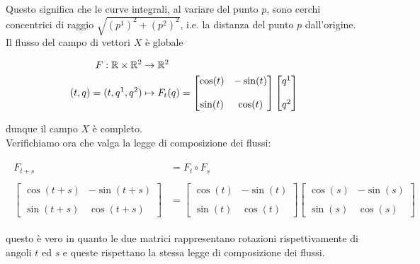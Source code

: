 Questo significa che le curve integrali, al variare del punto $ p $, sono cerchi concentrici di raggio $ \sqrt{(p^{1})^{2} + (p^{2})^{2}} $, i.e. la distanza del punto $ p $ dall'origine.\\
Il flusso del campo di vettori $ X $ è globale

\begin{align}
	\begin{split}
		F : \R \times \R^{2} &\to \R^{2}\\
		(t,q) = (t,q^{1},q^{2}) &\mapsto F_{t}(q) = %
		\begin{bmatrix}
			\cos(t) & - \sin(t) \\\\%
			\sin(t) & \cos(t)
		\end{bmatrix}%
		\begin{bmatrix}
			q^{1} \\\\ q^{2}
		\end{bmatrix}
	\end{split}
\end{align}

dunque il campo $ X $ è completo.\\
Verifichiamo ora che valga la legge di composizione dei flussi:

\begin{align}
	\begin{split}
		F_{t+s} &= F_{t} \circ F_{s}\\\\
		\begin{bmatrix}
			\cos(t+s) & - \sin(t+s) \\\\%
			\sin(t+s) & \cos(t+s)
		\end{bmatrix}%
		&= %
		\begin{bmatrix}
			\cos(t) & - \sin(t) \\\\%
			\sin(t) & \cos(t)
		\end{bmatrix}%
		\begin{bmatrix}
			\cos(s) & - \sin(s) \\\\%
			\sin(s) & \cos(s)
		\end{bmatrix}
	\end{split}
\end{align}

questo è vero in quanto le due matrici rappresentano rotazioni rispettivamente di angoli $ t $ ed $ s $ e queste rispettano la stessa legge di composizione dei flussi.

